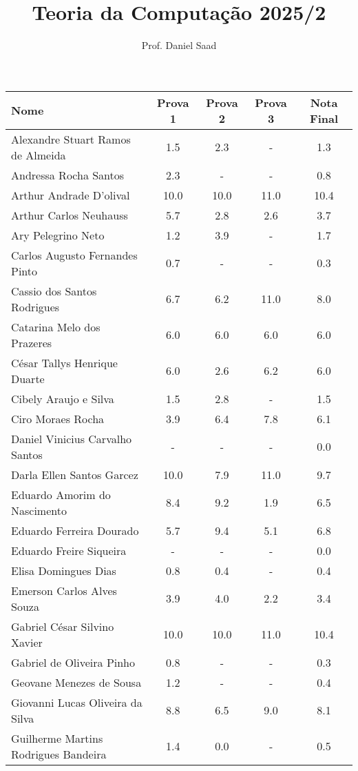\documentclass{article}
\title{ Teoria da Computação 2025/2}
\date{}
\author{ Prof. Daniel Saad}
\begin{document}
 \maketitle
    \begin{longtable}{|l|c|c|c|c|}
    \hline
Nome & Prova 1 & Prova 2 & Prova 3 & Nota Final\\\hline \endhead   
Alexandre Stuart Ramos de Almeida & 1.5 & 2.3 & - & 1.3\\\hline
Andressa Rocha Santos & 2.3 & - & - & 0.8\\\hline
Arthur Andrade D'olival & 10.0 & 10.0 & 11.0 & 10.4\\\hline
Arthur Carlos Neuhauss & 5.7 & 2.8 & 2.6 & 3.7\\\hline
Ary Pelegrino Neto & 1.2 & 3.9 & - & 1.7\\\hline
Carlos Augusto Fernandes Pinto & 0.7 & - & - & 0.3\\\hline
Cassio dos Santos Rodrigues & 6.7 & 6.2 & 11.0 & 8.0\\\hline
Catarina Melo dos Prazeres & 6.0 & 6.0 & 6.0 & 6.0\\\hline
César Tallys Henrique Duarte & 6.0 & 2.6 & 6.2 & 6.0\\\hline
Cibely Araujo e Silva & 1.5 & 2.8 & - & 1.5\\\hline
Ciro Moraes Rocha & 3.9 & 6.4 & 7.8 & 6.1\\\hline
Daniel Vinicius Carvalho Santos & - & - & - & 0.0\\\hline
Darla Ellen Santos Garcez & 10.0 & 7.9 & 11.0 & 9.7\\\hline
Eduardo Amorim do Nascimento & 8.4 & 9.2 & 1.9 & 6.5\\\hline
Eduardo Ferreira Dourado & 5.7 & 9.4 & 5.1 & 6.8\\\hline
Eduardo Freire Siqueira & - & - & - & 0.0\\\hline
Elisa Domingues Dias & 0.8 & 0.4 & - & 0.4\\\hline
Emerson Carlos Alves Souza & 3.9 & 4.0 & 2.2 & 3.4\\\hline
Gabriel César Silvino Xavier & 10.0 & 10.0 & 11.0 & 10.4\\\hline
Gabriel de Oliveira Pinho & 0.8 & - & - & 0.3\\\hline
Geovane Menezes de Sousa & 1.2 & - & - & 0.4\\\hline
Giovanni Lucas Oliveira da Silva & 8.8 & 6.5 & 9.0 & 8.1\\\hline
Guilherme Martins Rodrigues Bandeira & 1.4 & 0.0 & - & 0.5\\\hline

\end{longtable}
\end{document}

